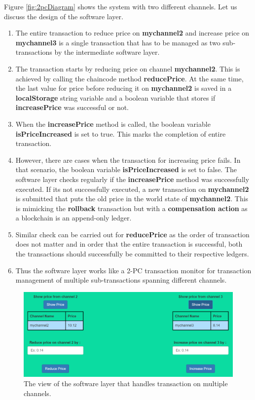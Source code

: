 \documentclass[
  a4paper,  %
  twoside,  %
  bibliography=totoc,
  headsepline,
  cleardoublepage=empty,
  parskip=half,
  draft=false
]{scrbook}
\begin{document}
Figure \ref{fig:2pcDiagram} shows the system with two different channels. Let us discuss the design of the software layer.
\begin{enumerate}
    \item The entire transaction to reduce price on \textbf{mychannel2} and increase price on \textbf{mychannel3} is a single transaction that has to be managed as two sub-transactions by the intermediate software layer.
    \item The transaction starts by reducing price on channel \textbf{mychannel2}. This is achieved by calling the chaincode method \textbf{reducePrice}. At the same time, the last value for price before reducing it on \textbf{mychannel2} is saved in a \textbf{localStorage} string variable and a boolean variable that stores if \textbf{increasePrice} was successful or not.
    \item When the \textbf{increasePrice} method is called, the boolean variable \textbf{isPriceIncreased} is set to true. This marks the completion of entire transaction.
    \item However, there are cases when the transaction for increasing price fails. In that scenario, the boolean variable \textbf{isPriceIncreased} is set to false. The software layer checks regularly if the \textbf{increasePrice} method was successfully executed. If its not successfully executed, a new transaction on \textbf{mychannel2} is submitted that puts the old price in the world state of \textbf{mychannel2}. This is mimicking the \textbf{rollback} transaction but with a \textbf{compensation action} as a blockchain is an append-only ledger.
    \item Similar check can be carried out for \textbf{reducePrice} as the order of transaction does not matter and in order that the entire transaction is successful, both the transactions should successfully be committed to their respective ledgers.
    \item Thus the software layer works like a 2-PC transaction monitor for transaction management of multiple sub-transactions spanning different channels.
\end{enumerate}
\begin{figure}[h!]
\begin{center}
\includegraphics[width=\textwidth]{graphics/2pc.png}
\caption{The view of the software layer that handles transaction on multiple channels. }
\label{fig:2pc}
\end{center}
\end{figure}
\end{document}
